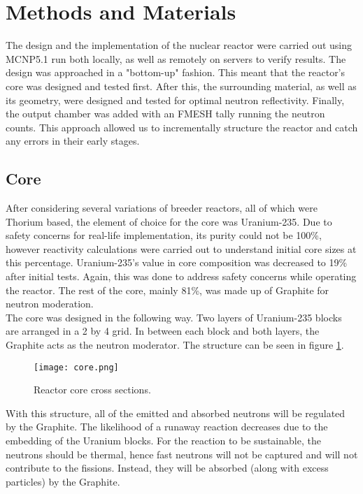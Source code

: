 \label{sec:methods}
\section{Methods and Materials}

The design and the implementation of the nuclear reactor were carried out using MCNP5.1 run both locally, as well as remotely on servers to verify results.  The design was approached in a "bottom-up" fashion. This meant that the reactor's core was designed and tested first. After this, the surrounding material, as well as its geometry, were designed and tested for optimal neutron reflectivity. Finally, the output chamber was added with an FMESH tally running the neutron counts. This approach allowed us to incrementally structure the reactor and catch any errors in their early stages.\\

\subsection{Core}

After considering several variations of breeder reactors, all of which were Thorium based, the element of choice for the core was Uranium-235. Due to safety concerns for real-life implementation, its purity could not be 100\%, however reactivity calculations were carried out to understand initial core sizes at this percentage. Uranium-235's value in core composition was decreased to 19\% after initial tests. Again, this was done to address safety concerns while operating the reactor. The rest of the core, mainly 81\%, was made up of Graphite for neutron moderation.\\

The core was designed in the following way. Two layers of Uranium-235 blocks are arranged in a 2 by 4 grid. In between each block and both layers, the Graphite acts as the neutron moderator. The structure can be seen in figure \ref{fig:core}.

\begin{figure}[!htbp]
\caption{Reactor core cross sections.}
\label{fig:core}
\centering
\texttt{[image: core.png]}
\end{figure}

With this structure, all of the emitted and absorbed neutrons will be regulated by the Graphite. The likelihood of a runaway reaction decreases due to the embedding of the Uranium blocks. For the reaction to be sustainable, the neutrons should be thermal, hence fast neutrons will not be captured and will not contribute to the fissions. Instead, they will be absorbed (along with excess particles) by the Graphite.\\

